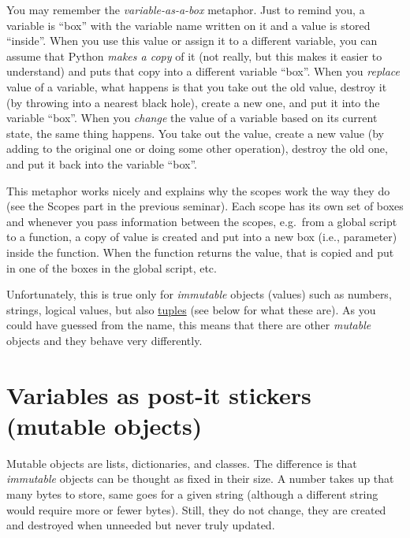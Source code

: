 \documentclass[
]{book}
\begin{document}
You may remember the \emph{variable-as-a-box} metaphor. Just to remind you, a variable is ``box'' with the variable name written on it and a value is stored ``inside''. When you use this value or assign it to a different variable, you can assume that Python \emph{makes a copy} of it (not really, but this makes it easier to understand) and puts that copy into a different variable ``box''. When you \emph{replace} value of a variable, what happens is that you take out the old value, destroy it (by throwing into a nearest black hole), create a new one, and put it into the variable ``box''. When you \emph{change} the value of a variable based on its current state, the same thing happens. You take out the value, create a new value (by adding to the original one or doing some other operation), destroy the old one, and put it back into the variable ``box''.

This metaphor works nicely and explains why the scopes work the way they do (see the Scopes part in the previous seminar). Each scope has its own set of boxes and whenever you pass information between the scopes, e.g.~from a global script to a function, a copy of value is created and put into a new box (i.e., parameter) inside the function. When the function returns the value, that is copied and put in one of the boxes in the global script, etc.

Unfortunately, this is true only for \emph{immutable} objects (values) such as numbers, strings, logical values, but also \href{https://docs.python.org/3/library/stdtypes.html?highlight=tuple\#tuple}{tuples} (see below for what these are). As you could have guessed from the name, this means that there are other \emph{mutable} objects and they behave very differently.

\hypertarget{variables-as-post-it-stickers-mutable-objects}{%
\section{Variables as post-it stickers (mutable objects)}\label{variables-as-post-it-stickers-mutable-objects}}

Mutable objects are lists, dictionaries, and classes. The difference is that \emph{immutable} objects can be thought as fixed in their size. A number takes up that many bytes to store, same goes for a given string (although a different string would require more or fewer bytes). Still, they do not change, they are created and destroyed when unneeded but never truly updated.
\end{document}
